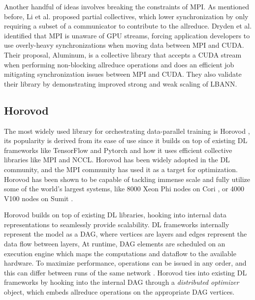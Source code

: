 Another handful of ideas involves breaking the constraints of \gls{MPI}.
As mentioned before, Li et al. \cite{Li2020DLPartialColl} proposed partial collectives, which lower synchronization by only requiring a subset of a communicator to contribute to the allreduce. 
Dryden et al. \cite{Dryden2018Aluminum} identified that \gls{MPI} is unaware of \gls{GPU} streams, forcing application developers to use overly-heavy synchronizations when moving data between MPI and \gls{CUDA}.
Their proposal, Aluminum, is a collective library that accepts a \gls{CUDA} stream when performing non-blocking allreduce operations and does an efficient job mitigating synchronization issues between \gls{MPI} and \gls{CUDA}.
They also validate their library by demonstrating improved strong and weak scaling of LBANN.

\subsection{Horovod}\label{sec:CH3-horovod}
The most widely used library for orchestrating data-parallel training is Horovod \cite{Sergeev2018Horovod}, its popularity is derived from its ease of use since it builds on top of existing \gls{DL} frameworks like TensorFlow and Pytorch and how it uses efficient collective libraries like \gls{MPI} and \gls{NCCL}.
Horovod has been widely adopted in the \gls{DL} community, and the \gls{MPI} community has used it as a target for optimization.
Horovod has been shown to be capable of tackling immense scale and fully utilize some of the world's largest systems, like 8000 Xeon Phi nodes on Cori \cite{Mathuriya2019Cosmoflow}, or 4000 V100 nodes on Sumit \cite{Kurth2018ExascaleDLClimate}.

Horovod builds on top of existing \gls{DL} libraries, hooking into internal data representations to seamlessly provide scalability.
\gls{DL} frameworks internally represent the model as a \gls{DAG}, where vertices are layers and edges represent the data flow between layers, 
At runtime, \gls{DAG} elements are scheduled on an execution engine which maps the computations and dataflow to the available hardware.
To maximize performance, operations can be issued in any order, and this can differ between runs of the same network \cite{Abadi2015TensorflowWhitepaper}. 
Horovod ties into existing \gls{DL} frameworks by hooking into the internal \gls{DAG} through a \textit{distributed optimizer} object, which embeds allreduce operations on the appropriate \gls{DAG} vertices.

